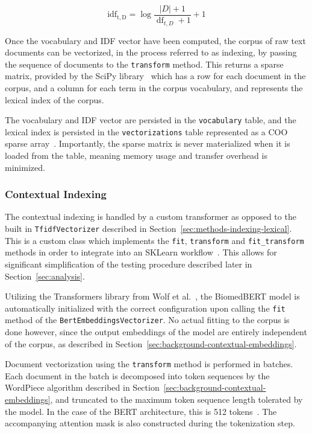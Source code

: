 \documentclass[11pt]{article}
\theoremstyle{plain}
\theoremstyle{definition}
\begin{document}
\begin{equation}\label{eq:sk-idf}
    \operatorname{idf_{t, D}} = \log {\frac{|D| + 1}{\operatorname{df}_{t, D} + 1}} + 1
\end{equation}

Once the vocabulary and IDF vector have been computed, the corpus of raw text documents can be vectorized, in the process referred to as indexing, by passing the sequence of documents to the \verb|transform| method. This returns a sparse matrix, provided by the SciPy library~\cite{virtanen/2020/scipy} which has a row for each document in the corpus, and a column for each term in the corpus vocabulary, and represents the lexical index of the corpus.

The vocabulary and IDF vector are persisted in the \verb|vocabulary| table, and the lexical index is persisted in the \verb|vectorizations| table represented as a COO sparse array~\cite{scipy/2026/cooarray}. Importantly, the sparse matrix is never materialized when it is loaded from the table, meaning memory usage and transfer overhead is minimized.

\subsubsection{Contextual Indexing}\label{sec:methods-indexing-contextual}

The contextual indexing is handled by a custom transformer as opposed to the built in \verb|TfidfVectorizer| described in Section~\ref{sec:methods-indexing-lexical}. This is a custom class which implements the \verb|fit|, \verb|transform| and \verb|fit_transform| methods in order to integrate into an SKLearn workflow~\cite{sklearn/2026/estimators}. This allows for significant simplification of the testing procedure described later in Section~\ref{sec:analysis}.

Utilizing the Transformers library from Wolf et al.\ \cite{wolf/2020/transformers}, the BiomedBERT model is automatically initialized with the correct configuration upon calling the \verb|fit| method of the \verb|BertEmbeddingsVectorizer|. No actual fitting to the corpus is done however, since the output embeddings of the model are entirely independent of the corpus, as described in Section~\ref{sec:background-contextual-embeddings}.

Document vectorization using the \verb|transform| method is performed in batches. Each document in the batch is decomposed into token sequences by the WordPiece algorithm described in Section~\ref{sec:background-contextual-embeddings}, and truncated to the maximum token sequence length tolerated by the model. In the case of the BERT architecture, this is 512 tokens~\cite{sun/2019/finetune}. The accompanying attention mask is also constructed during the tokenization step.
\end{document}
